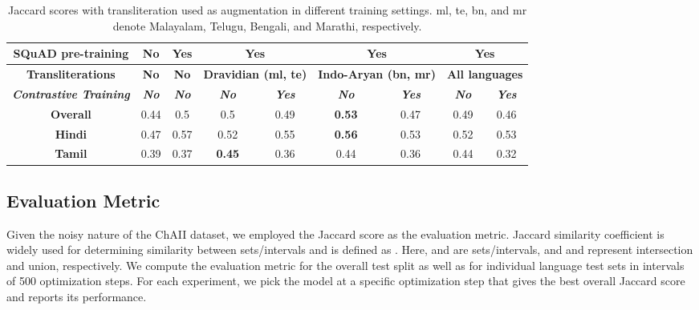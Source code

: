 \documentclass[11pt]{article}
\begin{document}
\begin{table*}[!hbt]
\centering
\begin{tabular}{|c|c|c|cc|cc|cc|}
\hline
\textbf{SQuAD pre-training}            & \textbf{No}          & \textbf{Yes}         & \multicolumn{2}{c|}{\textbf{Yes}}                & \multicolumn{2}{c|}{\textbf{Yes}}                 & \multicolumn{2}{c|}{\textbf{Yes}}             \\
\hline
\textbf{Transliterations}              & \textbf{No}          & \textbf{No}          & \multicolumn{2}{c|}{\textbf{Dravidian (ml, te)}} & \multicolumn{2}{c|}{\textbf{Indo-Aryan (bn, mr)}} & \multicolumn{2}{c|}{\textbf{All languages}}   \\
\hline
\textit{\textbf{Contrastive Training}} & \textit{\textbf{No}} & \textit{\textbf{No}} & \textit{\textbf{No}}   & \textit{\textbf{Yes}}  & \textit{\textbf{No}}   & \textit{\textbf{Yes}}   & \textit{\textbf{No}} & \textit{\textbf{Yes}} \\
\hline
\textbf{Overall}                       & 0.44                 & 0.5                  & 0.5                    & 0.49                   & \textbf{0.53}          & 0.47                    & 0.49                 & 0.46                  \\
\textbf{Hindi}                         & 0.47                 & 0.57                 & 0.52                   & 0.55                   & \textbf{0.56}          & 0.53                    & 0.52                 & 0.53                  \\
\textbf{Tamil}                         & 0.39                 & 0.37                 & \textbf{0.45}          & 0.36                   & 0.44                   & 0.36                    & 0.44                 & 0.32       \\
\hline
\end{tabular}
\caption{Jaccard scores with transliteration used as augmentation in different training settings. ml, te, bn, and mr denote Malayalam, Telugu, Bengali, and Marathi, respectively.}
\label{table:tlit}
\end{table*}

\subsection{Evaluation Metric}

Given the noisy nature of the ChAII dataset, we employed the Jaccard score as the evaluation metric. Jaccard similarity coefficient is widely used for determining similarity between sets/intervals and is defined as . Here,  and  are sets/intervals, and  and  represent intersection and union, respectively. We compute the evaluation metric for the overall test split as well as for individual language test sets in intervals of 500 optimization steps. For each experiment, we pick the model at a specific optimization step that gives the best overall Jaccard score and reports its performance.
\end{document}
